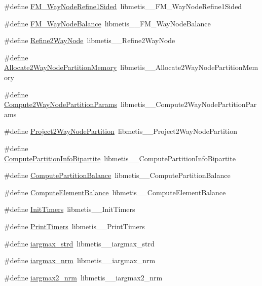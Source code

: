 \begin{DoxyCompactItemize}
\item 
\#define \hyperlink{a00957_a88025bd90f8222cbec4ed937b60c5b49}{F\+M\+\_\+Way\+Node\+Refine1\+Sided}~libmetis\+\_\+\+\_\+\+F\+M\+\_\+Way\+Node\+Refine1\+Sided
\item 
\#define \hyperlink{a00957_a6c561083083a331393b89c5d1807d4ab}{F\+M\+\_\+Way\+Node\+Balance}~libmetis\+\_\+\+\_\+\+F\+M\+\_\+Way\+Node\+Balance
\item 
\#define \hyperlink{a00957_ad6dfafec55e676b5fa4ce47045836395}{Refine2\+Way\+Node}~libmetis\+\_\+\+\_\+\+Refine2\+Way\+Node
\item 
\#define \hyperlink{a00957_a36a480cbef2254cbd5559f782b415593}{Allocate2\+Way\+Node\+Partition\+Memory}~libmetis\+\_\+\+\_\+\+Allocate2\+Way\+Node\+Partition\+Memory
\item 
\#define \hyperlink{a00957_a549d8ec21a867a7313b03e31b617fec0}{Compute2\+Way\+Node\+Partition\+Params}~libmetis\+\_\+\+\_\+\+Compute2\+Way\+Node\+Partition\+Params
\item 
\#define \hyperlink{a00957_a588dddd227addbe9b23eede64724fc2d}{Project2\+Way\+Node\+Partition}~libmetis\+\_\+\+\_\+\+Project2\+Way\+Node\+Partition
\item 
\#define \hyperlink{a00957_a51213c9d78a464b4e77399ff176de1b7}{Compute\+Partition\+Info\+Bipartite}~libmetis\+\_\+\+\_\+\+Compute\+Partition\+Info\+Bipartite
\item 
\#define \hyperlink{a00957_ad8fab137bfa8509bd839ba0ad4f394b1}{Compute\+Partition\+Balance}~libmetis\+\_\+\+\_\+\+Compute\+Partition\+Balance
\item 
\#define \hyperlink{a00957_a0d1543aae21f61ff65da573f52decbd5}{Compute\+Element\+Balance}~libmetis\+\_\+\+\_\+\+Compute\+Element\+Balance
\item 
\#define \hyperlink{a00957_a4a790a1f9ba8aca5c47e8f45be1c950e}{Init\+Timers}~libmetis\+\_\+\+\_\+\+Init\+Timers
\item 
\#define \hyperlink{a00957_acd33663c4b155c97f1ae722f34a23a72}{Print\+Timers}~libmetis\+\_\+\+\_\+\+Print\+Timers
\item 
\#define \hyperlink{a00957_ad5f0ec3507109957e00ab5554fe9c846}{iargmax\+\_\+strd}~libmetis\+\_\+\+\_\+iargmax\+\_\+strd
\item 
\#define \hyperlink{a00957_a4b3851d9f82f0c45f0d937c0199cd054}{iargmax\+\_\+nrm}~libmetis\+\_\+\+\_\+iargmax\+\_\+nrm
\item 
\#define \hyperlink{a00957_a139f4368d86dde755c72c5d73fb90d50}{iargmax2\+\_\+nrm}~libmetis\+\_\+\+\_\+iargmax2\+\_\+nrm
\item 

\end{DoxyCompactItemize}

